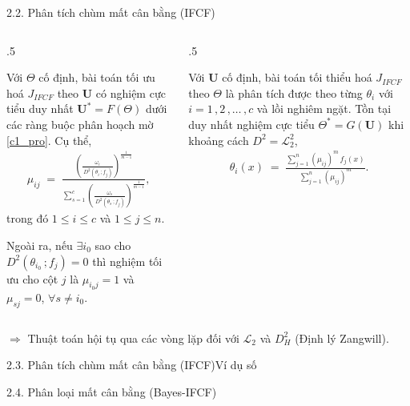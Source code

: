 \documentclass[oneside, aspectratio=169]{beamer}
\begin{document}
\begin{frame}{2.2. Phân tích chùm mất cân bằng (IFCF)}
	\begin{columns}
		\begin{column}{.5\textwidth}
			\small
			\begin{lemma}\label{lem1}
				Với $\Theta$ cố định, bài toán tối ưu hoá $J_{IFCF}$ theo $\bm U$ có nghiệm cực tiểu duy nhất $\bm U^*=F(\Theta)$ dưới các ràng buộc phân hoạch mờ \eqref{c1_pro}. Cụ thể,
				\begin{align}
					\mu_{ij} \;=\;
					\frac{
						\left (\frac{\omega_i}{\,D^2(\theta_i\,;f_j)}\right)^{\frac{1}{m-1}}
					}{
						\sum_{s=1}^c
						\left(\frac{\omega_s}{\,D^2(\theta_s\,;f_j)}\right)^{\frac{1}{m-1}}
					},
					\label{eq:ifcf_u_final}
				\end{align}
				trong đó $1\le i\le c$ và $1\le j\le n$.
			\end{lemma}
			Ngoài ra, nếu $\exists i_0$ sao cho $D^2(\theta_{i_0}\,;f_j)=0$ thì nghiệm tối ưu cho cột $j$ là $\mu_{i_0 j}=1$ và $\mu_{s j}=0$, $\forall s\neq i_0$.
		\end{column}
		\begin{column}{.5\textwidth}
			\small
			\begin{lemma}\label{lem2}
				Với $\bm U$ cố định, bài toán tối thiểu hoá $J_{IFCF}$ theo $\Theta$ là phân tích được theo từng $\theta_i$ với $i =1\,,2\,,\ldots\,,c$ và lồi nghiêm ngặt. Tồn tại duy nhất nghiệm cực tiểu $\Theta^*=G(\bm U)$ khi khoảng cách $D^2=\mathcal{L}_2^2$, 
				\begin{align}
					\theta_i(x)
					\;=\;
					\frac{\sum_{j=1}^n (\mu_{ij})^{m}\,f_j(x)}
					{\sum_{j=1}^n (\mu_{ij})^{m}}.
					\label{eq:theta_update}
				\end{align}
			\end{lemma}
		\end{column}
	\end{columns}
	{\color{CTUblue}
		$\Rightarrow$ Thuật toán hội tụ qua các vòng lặp đối với $\mathcal{L}_2$ và $D_H^2$ (Định lý Zangwill).
		}
\end{frame}


\begin{frame}{2.3. Phân tích chùm mất cân bằng (IFCF)}{Ví dụ số}
	
\end{frame}

\begin{frame}{2.4. Phân loại mất cân bằng (Bayes-IFCF)}
	
\end{frame}
\end{document}
